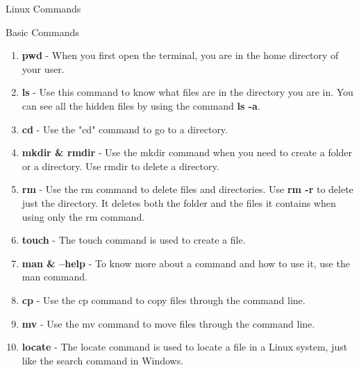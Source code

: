 \documentclass{if-beamer}
\begin{document}
\begin{frame}{Linux Commands}
\begin{alertblock}{Basic Commands}
\begin{enumerate}
    \item \textbf{pwd} - When you first open the terminal, you are in the home directory of your user.
    \item \textbf{ls} - Use this command to know what files are in the directory you are in. You can see all the hidden files by using the command \textbf{ls -a}.
    \item \textbf{cd} - Use the "cd" command to go to a directory.
    \item \textbf{mkdir \& rmdir} - Use the mkdir command when you need to create a folder or a directory. Use rmdir to delete a directory.
    \item \textbf{rm} - Use the rm command to delete files and directories.  Use \textbf{rm -r} to delete just the directory. It deletes both the folder and the files it contains when using only the rm command.
    \item \textbf{touch} -  The touch command is used to create a file.
    \item \textbf{man \& --help} - To know more about a command and how to use it, use the man command.
    \item \textbf{cp} - Use the cp command to copy files through the command line.
    \item \textbf{mv } -  Use the mv command to move files through the command line.
    \item \textbf{locate } - The locate command is used to locate a file in a Linux system, just like the search command in Windows. 
\end{enumerate}
\end{alertblock}
\end{frame}
\end{document}
